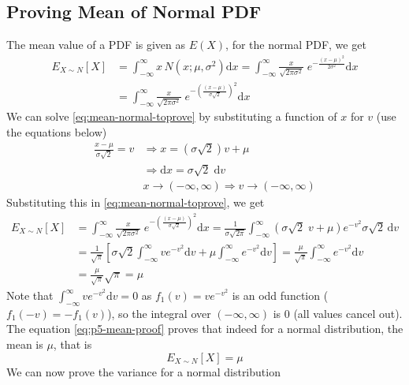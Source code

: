 \documentclass[main.tex]{article}
\begin{document}
    \subsection[Proof of \texorpdfstring{$\mu$}{mean}]{Proving Mean of Normal PDF}
    \label{subsec:proof-mu-normal}
    The mean value of a PDF is given as $E(X)$, for the normal PDF, we get
    \begin{equation}
        \begin{split}
            E_{X\sim N}[X] & = \int_{-\infty}^{\infty} x \, N(x; \mu, \sigma^2) \mathrm{d}x
            = \int_{-\infty}^{\infty} \frac{x}{\sqrt{2\pi \sigma^2}} \; e^{ -\frac{(x-\mu)^2}{2\sigma^2}} \mathrm{d}x \\
            & = \int_{-\infty}^{\infty} \frac{x}{\sqrt{2\pi \sigma^2}} \; e^{ -\left (\frac{(x-\mu)}{\sigma\sqrt{2}}\right )^2} \mathrm{d}x
        \end{split}
        \label{eq:mean-normal-toprove}
    \end{equation}
    We can solve \ref{eq:mean-normal-toprove} by substituting a function of $x$ for $v$ (use the equations below)
    \begin{equation}
        \begin{split}
            \frac{x-\mu}{\sigma\sqrt{2}} = v & \Rightarrow x = \left ( \sigma\sqrt{2} \right ) v + \mu \\
            & \Rightarrow \mathrm{d}x = \sigma \sqrt{2} \; \mathrm{d}v \\
            & x \rightarrow (-\infty, \infty) \Rightarrow v \rightarrow (-\infty, \infty)
        \end{split}
    \end{equation}
    Substituting this in \ref{eq:mean-normal-toprove}, we get
    \begin{equation}
        \begin{split}
            E_{X\sim N}[X] & = \int_{-\infty}^{\infty} \frac{x}{\sqrt{2\pi \sigma^2}} \; e^{ -\left (\frac{(x-\mu)}{\sigma\sqrt{2}}\right )^2} \mathrm{d}x 
            = \frac{1}{\sigma \sqrt{2\pi}} \int_{-\infty}^{\infty} \left ( \sigma \sqrt{2} \; v + \mu \right ) e^{-v^2} \sigma \sqrt{2} \, \mathrm{d}v \\
            & = \frac{1}{\sqrt{\pi}} \left [ \sigma \sqrt{2} \int_{-\infty}^{\infty} ve^{-v^2} \mathrm{d}v + \mu \int_{-\infty}^{\infty} e^{-v^2} \mathrm{d}v \right ]
            = \frac{\mu}{\sqrt{\pi}} \int_{-\infty}^{\infty} e^{-v^2} \mathrm{d}v \\
            & = \frac{\mu}{\sqrt{\pi}} \sqrt{\pi} = \mu
        \end{split}
        \label{eq:p5-mean-proof}
    \end{equation}
    Note that $\int_{-\infty}^{\infty} ve^{-v^2} \mathrm{d}v = 0$ as $f_1(v) = ve^{-v^2}$ is an odd function ($f_1(-v) = -f_1(v)$), so the integral over $(-\infty, \infty)$ is $0$ (all values cancel out). The equation \ref{eq:p5-mean-proof} proves that indeed for a normal distribution, the mean is $\mu$, that is
    \begin{equation}
        E_{X\sim N}[X] = \mu
    \end{equation}
    We can now prove the variance for a normal distribution
\end{document}
